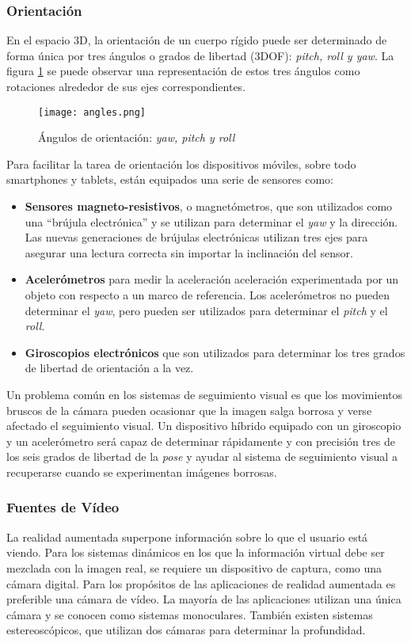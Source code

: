 \subsubsection{Orientación}
En el espacio 3D, la orientación de un cuerpo rígido puede ser determinado de forma única por tres ángulos o grados de libertad (3DOF): \emph{pitch, roll y yaw}. La figura \ref{fig:ángulos}  se puede observar una representación de estos tres ángulos como rotaciones alrededor de sus ejes correspondientes. 

\begin{figure}[b]
  \centering
  \texttt{[image: angles.png]}
  \caption{Ángulos de orientación: \emph{yaw, pitch y roll}}
  \label{fig:ángulos}
\end{figure}

Para facilitar la tarea de orientación los dispositivos móviles, sobre todo smartphones y tablets, están equipados una serie de sensores como:

\begin{itemize}
\item\textbf{Sensores magneto-resistivos}, o magnetómetros, que son utilizados como una ``brújula electrónica'' y se utilizan para determinar el \emph{yaw} y la dirección. Las nuevas generaciones de brújulas electrónicas utilizan tres ejes para asegurar una lectura correcta sin importar la inclinación del sensor.
\item\textbf{Acelerómetros} para medir la aceleración aceleración experimentada por un objeto con respecto a un marco de referencia. Los acelerómetros no pueden determinar el \emph{yaw}, pero pueden ser utilizados para determinar el \emph{pitch} y el \emph{roll}. 
\item\textbf{Giroscopios electrónicos} que son utilizados para determinar los tres grados de libertad de orientación a la vez.
\end{itemize}

Un problema común en los sistemas de seguimiento visual es que los movimientos bruscos de la cámara pueden ocasionar que la imagen salga borrosa y verse afectado el seguimiento visual. Un dispositivo híbrido equipado con un giroscopio y un acelerómetro será capaz de determinar rápidamente y con precisión tres de los seis grados de libertad de la \emph{pose} y ayudar al sistema de seguimiento visual a recuperarse cuando se experimentan imágenes borrosas. 

\subsubsection{Fuentes de Vídeo}
La realidad aumentada superpone información sobre lo que el usuario está viendo. Para los sistemas dinámicos en los que la información virtual debe ser mezclada con la imagen real, se requiere un dispositivo de captura, como una cámara digital. Para los propósitos de las aplicaciones de realidad aumentada es preferible una cámara de vídeo. La mayoría de las aplicaciones utilizan una única cámara y se conocen como sistemas monoculares. También existen sistemas estereoscópicos, que  utilizan dos cámaras para determinar la profundidad.

